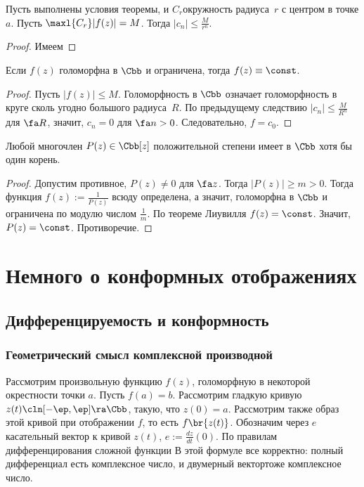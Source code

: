 \documentclass[a4paper]{article}
\begin{document}
\begin{imp}
Пусть выполнены условия теоремы, и $C_r$\т окружность радиуса~$r$ с центром в точке $a$.
Пусть $\maxl{C_r}|f(z)| = M$. Тогда $|c_n| \le \frac{M}{r^n}$.
\end{imp}
\begin{proof}
Имеем
\hfill\end{proof}

\begin{imp}
Если $f(z)$ голоморфна в $\Cbb$ и ограничена, тогда $f(z) \equiv \const$.
\end{imp}
\begin{proof}
Пусть $|f(z)| \le M$. Голоморфность в $\Cbb$ означает голоморфность в круге сколь
угодно большого радиуса~$R$. По предыдущему следствию $|c_n| \le \frac{M}{R^n}$ для $\fa R$, значит,
$c_n = 0$ для $\fa n > 0$. Следовательно, $f = c_0$.
\end{proof}
\begin{imp}
Любой многочлен $P(z) \in \Cbb[z]$ положительной степени имеет в $\Cbb$ хотя бы один корень.
\end{imp}
\begin{proof}
Допустим противное,  $P(z)\neq 0$ для $\fa z$. Тогда $|P(z)| \ge m > 0$.
Тогда функция $f(z) := \frac{1}{P(z)}$ всюду определена, а значит, голоморфна в $\Cbb$ и ограничена по модулю
числом $\frac{1}{m}$. По теореме Лиувилля $f(z)=\const$. Значит, $P(z)=\const$. Противоречие.
\end{proof}

\section{Немного о конформных отображениях}

\subsection{Дифференцируемость и конформность}

\subsubsection{Геометрический смысл комплексной производной}

Рассмотрим произвольную функцию $f(z)$, голоморфную в некоторой окрестности точки $a$. Пусть $f(a)=b$.
Рассмотрим гладкую кривую $z(t)\cln [-\ep,\ep]\ra \Cbb$, такую, что $z(0)=a$. Рассмотрим также образ
этой кривой при отображении $f$, то есть $f\br{z(t)}$.
Обозначим через $e$ касательный вектор к кривой $z(t)$,  $e := \frac{dz}{dt}(0)$.
По правилам дифференцирования сложной функции
В этой формуле все корректно: полный дифференциал есть комплексное число, и двумерный вектор\т тоже
комплексное число.
\end{document}
